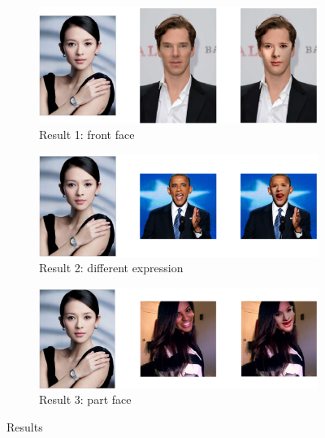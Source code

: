 \documentclass[10pt,twocolumn,letterpaper]{article}
\begin{document}
\begin{figure}
\centering
   \begin{subfigure}[b]{0.4\textwidth}
   \includegraphics[width=1\linewidth]{3_4.eps}
   \caption{Result 1: front face}
   \label{fig:eg1}
\end{subfigure}

\begin{subfigure}[b]{0.4\textwidth}
   \includegraphics[width=1\linewidth]{3_10.eps}
   \caption{Result 2: different expression}
   \label{fig:eg2}
\end{subfigure}
\begin{subfigure}[b]{0.4\textwidth}
   \includegraphics[width=1\linewidth]{3_9.eps}
   \caption{Result 3: part face}
   \label{fig:eg3}
\end{subfigure}
\caption{Results}\label{result}
\end{figure}
\end{document}
